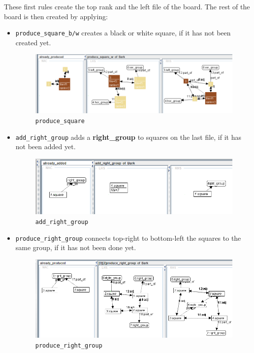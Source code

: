 \documentclass[a4paper, 10pt]{scrartcl}
\newcommand{\noderepr}[1]{\textsf{\textbf{#1}}}
\begin{document}
    These first rules create the top rank and the left file of the board. The rest of the board is then created by applying:
    \begin{itemize}
        \item \texttt{produce\_square\_b/w} creates a black or white square, if it has not been created yet.
        \begin{figure}[H]
            \centering
            \includegraphics[width=.8\linewidth]{images/produce_square.png}
            \caption{\texttt{produce\_square}}
        \end{figure}

        \item \texttt{add\_right\_group} adds a \noderepr{right\_group} to squares on the last file, if it has not been added yet.
        \begin{figure}[H]
            \centering
            \includegraphics[width=.8\linewidth]{images/add_right_group.png}
            \caption{\texttt{add\_right\_group}}
        \end{figure}

        \item \texttt{produce\_right\_group} connects top-right to bottom-left the squares to the same group, if it has not been done yet.
        \begin{figure}[H]
            \centering
            \includegraphics[width=.8\linewidth]{images/produce_right_group.png}
            \caption{\texttt{produce\_right\_group}}
        \end{figure}
    \end{itemize}
\end{document}

